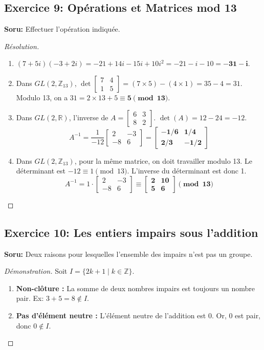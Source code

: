 \documentclass[12pt,a4paper]{report}
\begin{document}
\subsection*{Exercice 9: Opérations et Matrices mod 13}
\textbf{Soru:} Effectuer l'opération indiquée.
\begin{proof}[Résolution]
\begin{enumerate}
    \item[(a)] $(7+5i)(-3+2i) = -21 + 14i - 15i + 10i^2 = -21 - i - 10 = \mathbf{-31 - i}$.
    \item[(b)] Dans $GL(2, \mathbb{Z}_{13})$, $\det \begin{bmatrix} 7 & 4 \\ 1 & 5 \end{bmatrix} = (7 \times 5) - (4 \times 1) = 35 - 4 = 31$. Modulo 13, on a $31 = 2 \times 13 + 5 \equiv \mathbf{5 \pmod{13}}$.
    \item[(c)] Dans $GL(2, \mathbb{R})$, l'inverse de $A = \begin{bmatrix} 6 & 3 \\ 8 & 2 \end{bmatrix}$. 
    $\det(A) = 12 - 24 = -12$. 
    \[ A^{-1} = \frac{1}{-12} \begin{bmatrix} 2 & -3 \\ -8 & 6 \end{bmatrix} = \mathbf{\begin{bmatrix} -1/6 & 1/4 \\ 2/3 & -1/2 \end{bmatrix}} \]
    \item[(d)] Dans $GL(2, \mathbb{Z}_{13})$, pour la même matrice, on doit travailler modulo 13. Le déterminant est $-12 \equiv 1 \pmod{13}$. L'inverse du déterminant est donc 1.
    \[ A^{-1} = 1 \cdot \begin{bmatrix} 2 & -3 \\ -8 & 6 \end{bmatrix} \equiv \mathbf{\begin{bmatrix} 2 & 10 \\ 5 & 6 \end{bmatrix} \pmod{13}} \]
\end{enumerate}
\end{proof}

\subsection*{Exercice 10: Les entiers impairs sous l'addition}
\textbf{Soru:} Deux raisons pour lesquelles l'ensemble des impairs n'est pas un groupe.
\begin{proof}[Démonstration]
Soit $I = \{2k+1 \mid k \in \mathbb{Z}\}$.
\begin{enumerate}
    \item \textbf{Non-clôture :} La somme de deux nombres impairs est toujours un nombre pair. Ex: $3 + 5 = 8 \notin I$.
    \item \textbf{Pas d'élément neutre :} L'élément neutre de l'addition est $0$. Or, $0$ est pair, donc $0 \notin I$.
\end{enumerate}
\end{proof}
\end{document}
